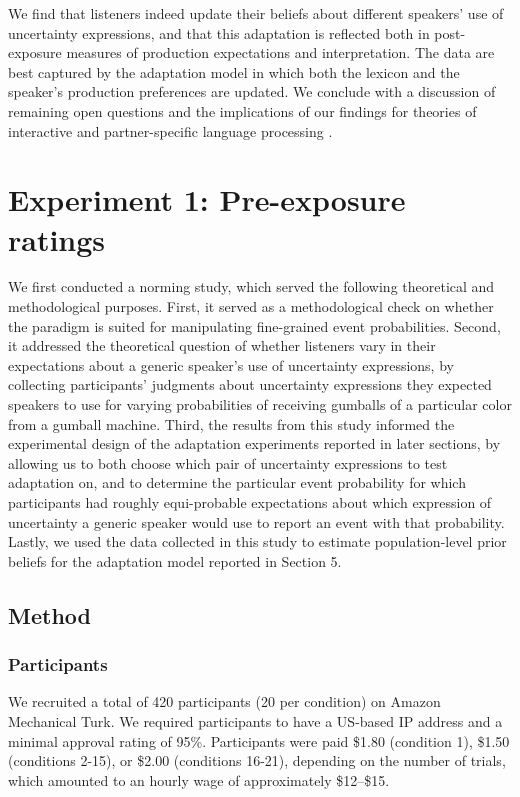 \documentclass[man, floatsintext]{apa6}
\begin{document}
We find that listeners indeed update their beliefs about different  speakers' use of uncertainty expressions, and that this adaptation is reflected both in post-exposure measures of production expectations and interpretation. The data are best captured by the adaptation model in which both the lexicon and the speaker's production preferences are updated. We conclude with a discussion of remaining open questions and the implications of our findings for theories
of interactive  \parencite[e.g.,][]{Pickering2004,Pickering2013} and partner-specific language processing \parencite[e.g.,][]{Metzing2003,Horton2005,Horton2016}.

\section{Experiment 1: Pre-exposure ratings}
\label{sec:exp-norming}

We first conducted a norming study, which served the following theoretical and methodological purposes.
First, it served as a methodological check on whether the paradigm is suited for 
manipulating fine-grained event probabilities. 
Second, it addressed the theoretical question of whether listeners vary in their expectations about
a generic speaker's use of uncertainty expressions, by collecting participants' judgments about 
uncertainty expressions they expected speakers to use for varying probabilities of receiving gumballs of a particular color from a gumball machine. 
Third,  the results from this study informed the experimental design of the adaptation experiments 
reported in later sections, by allowing us to both choose which pair of uncertainty expressions to test adaptation on, 
and to determine the particular event probability for which participants had roughly equi-probable expectations 
about which expression of uncertainty a generic speaker would use to report an event with that probability. 
Lastly, we used the data collected in this study to 
estimate population-level prior beliefs for the adaptation model reported in Section 5.

\subsection{Method}

\subsubsection{Participants}
We recruited a total of 420 participants 
(20 per condition) on Amazon Mechanical Turk. 
We required participants to have a US-based IP address and a minimal approval rating of 95\%.
Participants were paid \$1.80 (condition 1), \$1.50 (conditions 2-15),
or \$2.00 (conditions 16-21),
depending on the number of trials,
which amounted to an hourly wage of approximately \$12--\$15. 
\end{document}

